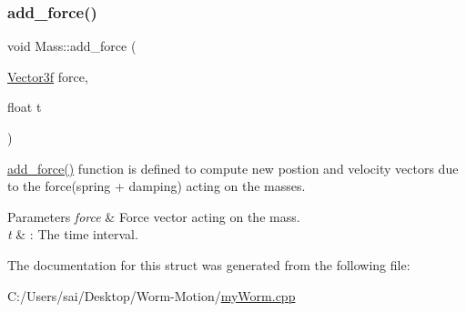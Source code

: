 \subsubsection{\texorpdfstring{add\+\_\+force()}{add\_force()}}
{\footnotesize\ttfamily void Mass\+::add\+\_\+force (\begin{DoxyParamCaption}\item[{\mbox{\hyperlink{class_vector3f}{Vector3f}}}]{force,  }\item[{float}]{t }\end{DoxyParamCaption})}

\mbox{\hyperlink{struct_mass_a7e47cabb99c2108fa6b5a8295967aa4f}{add\+\_\+force()}} function is defined to compute new postion and velocity vectors due to the force(spring + damping) acting on the masses. 
\begin{DoxyParams}{Parameters}
{\em force} & Force vector acting on the mass. \\
\hline
{\em t} & \+: The time interval. \\
\hline
\end{DoxyParams}


The documentation for this struct was generated from the following file\+:\begin{DoxyCompactItemize}
\item 
C\+:/\+Users/sai/\+Desktop/\+Worm-\/\+Motion/\mbox{\hyperlink{my_worm_8cpp}{my\+Worm.\+cpp}}\end{DoxyCompactItemize}
